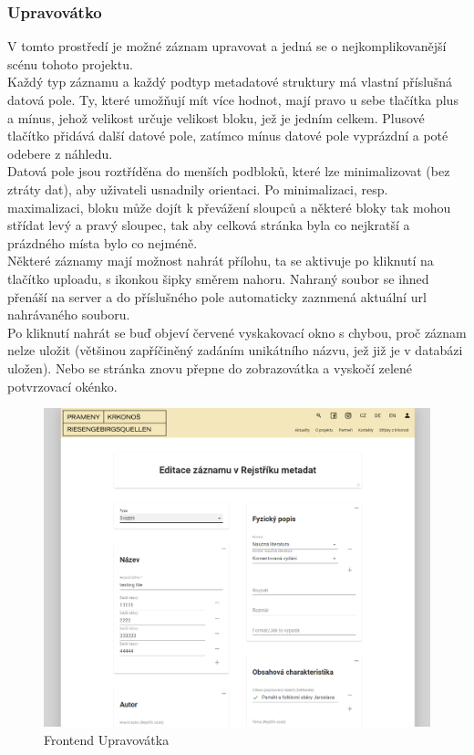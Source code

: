 \subsubsection{Upravovátko}
V tomto prostředí je možné záznam upravovat a jedná se o nejkomplikovanější scénu tohoto projektu.\\
Každý typ záznamu a každý podtyp metadatové struktury má vlastní příslušná datová pole.
Ty, které umožňují mít více hodnot, mají pravo u sebe tlačítka plus a mínus,
jehož velikost určuje velikost bloku, jež je jedním celkem. Plusové tlačítko přidává
další datové pole, zatímco mínus datové pole vyprázdní a poté odebere z náhledu.\\
Datová pole jsou roztříděna do menších podbloků, které lze minimalizovat (bez ztráty dat),
aby uživateli usnadnily orientaci. Po minimalizaci, resp. maximalizaci, bloku může dojít k převážení
sloupců a některé bloky tak mohou střídat levý a pravý sloupec, tak aby celková stránka byla co nejkratší
a prázdného místa bylo co nejméně.\\
Některé záznamy mají možnost nahrát přílohu, ta se aktivuje po kliknutí na tlačítko uploadu, s ikonkou šipky
směrem nahoru. Nahraný soubor se ihned přenáší na server a do příslušného pole automaticky 
zaznmená aktuální url nahrávaného souboru.\\
Po kliknutí nahrát se buď objeví červené vyskakovací okno s chybou, proč záznam nelze uložit
(většinou zapříčiněný zadáním unikátního názvu, jež již je v databázi uložen).
Nebo se stránka znovu přepne do zobrazovátka a vyskočí zelené potvrzovací okénko.
\begin{figure}[H]
	\centering
	\includegraphics[width=.8\linewidth]{img/editScene.png}
	\caption{Frontend Upravovátka}
\end{figure}


